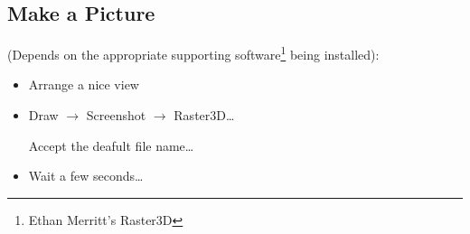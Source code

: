 \documentclass{article}
\begin{document}
\subsection{Make a Picture}

(Depends on the appropriate supporting software\footnote{Ethan
  Merritt's Raster3D} being installed):

\begin{itemize}
\item Arrange a nice view
\item \textsf{Draw} $\rightarrow$ \textsf{Screenshot} $\rightarrow$ \textsf{Raster3D\ldots}

  Accept the deafult file name\ldots
\item Wait a few seconds\ldots
\end{itemize}



\end{document}
